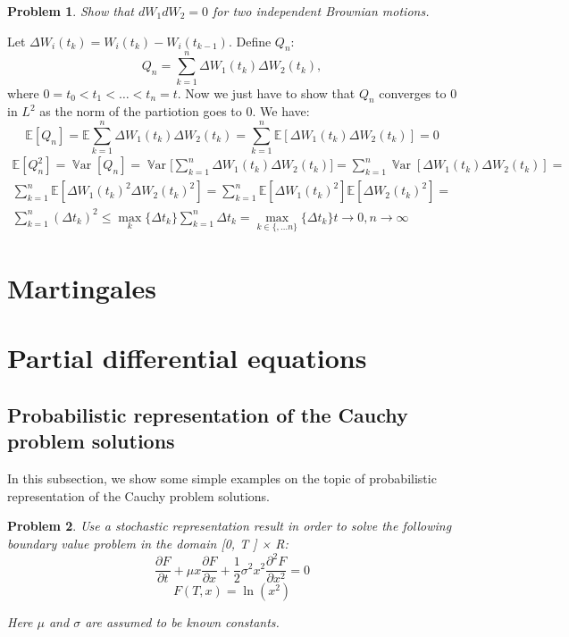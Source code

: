 \documentclass[a4paper, 12pt]{article}
\theoremstyle{problemstyle}
\newtheorem{problem}{Problem}[section]
\newcommand{\E}{\mathbb{E}}
\DeclareMathOperator{\Var}{\mathbb{V}ar}
\begin{document}
\begin{problem}
	Show that $dW_1 dW_2 = 0 $ for two independent Brownian motions.
\end{problem}
Let $\Delta W_i(t_k)  = W_i(t_k) - W_i(t_{k-1})$.
Define $Q_n$:
$$
Q_n = \sum_{k=1}^n  \Delta W_1(t_k) \Delta W_2(t_k),
$$
where $0 = t_0 < t_1 < \ldots <t_n = t$. Now we just have to show that $Q_n$ converges to $0$ in $L^2$ as the norm of the partiotion goes to $0$. We have:
$$
\E[Q_n] = \E \sum_{k=1}^n  \Delta W_1(t_k) \Delta W_2(t_k)  =  \sum_{k=1}^n  \E[ \Delta W_1(t_k) \Delta W_2(t_k)] = 0
$$
\begin{multline*}
\E[Q_n^2] = \Var[Q_n]  = \Var\bigg[ \sum_{k=1}^n  \Delta W_1(t_k) \Delta W_2(t_k)  \bigg] = 
 \sum_{k=1}^n \Var[\Delta W_1(t_k) \Delta W_2(t_k)] = \\
 \sum_{k=1}^n  \E[\Delta W_1(t_k)^2 \Delta W_2(t_k)^2] = \sum_{k=1}^n  \E[\Delta W_1(t_k)^2] \E[\Delta W_2(t_k)^2]  = \\ \sum_{k=1}^n  (\Delta t_k)^2 \leq 
 \max_k \{\Delta t_k \} \sum_{k=1}^n \Delta t_k =  \max_{k \in \{, \ldots n\}} \{\Delta t_k \} t \to 0, n \to \infty
\end{multline*}

\section{Martingales}

\section{Partial differential equations}
\subsection{Probabilistic representation of the Cauchy problem solutions}

\noindent In this subsection, we show some simple examples on the topic of probabilistic representation of the Cauchy problem solutions.

\begin{problem}
Use a stochastic representation result in order to solve the following boundary value problem in the domain [0, T ] × R:
$$
\frac{\partial F}{\partial t} + \mu x \frac{\partial F}{\partial x} + \frac{1}{2} \sigma^2 x^2 \frac{\partial^2 F}{\partial x^2 } = 0
$$    
$$
F(T,x) = \ln(x^2) 
$$

Here $\mu$ and $\sigma$ are assumed to be known constants.

\end{problem}
\end{document}
